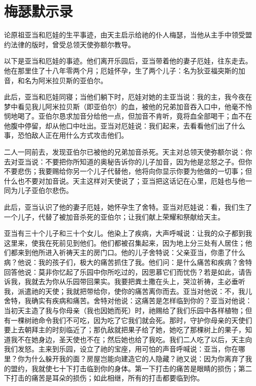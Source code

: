 
\chapter{梅瑟默示录}


论原祖亚当和厄娃的生平事迹，由天主启示给祂的仆人梅瑟，当他从主手中领受盟约法律的版时，曾受总领天使弥额尔教导。\par

以下是亚当和厄娃的事迹。他们离开乐园后，亚当带着他的妻子厄娃，往东走去。他在那里住了十八年零两个月；厄娃怀孕，生了两个儿子：名为狄亚福突斯的加音，和名为阿米拉贝斯的亚伯尔。\par

此后，亚当和厄娃同寝；当他们躺下时，厄娃对她的主亚当说：我的主，我今夜在梦中看见我儿阿米拉贝斯（即亚伯尔）的血，被他的兄弟加音吞入口中，他毫不怜悯地喝了。亚伯尔恳求加音分给他一点，但加音不肯听，竟将血全部喝干；血不在他腹中停留，却从他口中吐出。亚当对厄娃说：我们起来，去看看他们出了什么事，恐怕敌人正在用什么方式攻击他们。\par

二人一同前去，发现亚伯尔已被他的兄弟加音杀死。天主对总领天使弥额尔说：你去对亚当说：不要把你所知道的奥秘告诉你的儿子加音，因为他是忿怒之子。但你不要悲伤；我要赐给你另一个儿子代替他，他将向你显示你要为他做的一切事；但什么也不要对加音说。天主这样对天使说了；亚当把这话记在心里，厄娃也与他一同为儿子亚伯尔悲伤。\par

此后，亚当认识了他的妻子厄娃，她怀孕生了舍特。亚当对厄娃说：看，我们生了一个儿子，代替了被加音杀死的亚伯尔；让我们献上荣耀和祭献给天主。\par

亚当有三十个儿子和三十个女儿。他染上了疾病，大声呼喊说：让我的众子都到我这里来，使我在死前见到他们。他们都被召集起来，因为地上分三处有人居住；他们都来到他所进入祈祷天主的房门口。他的儿子舍特说：父亲亚当，你患了什么病？他说：我的孩子们，极大的痛苦抓住了我。他们问：是什么痛苦和疾病？舍特回答他说：莫非你忆起了乐园中你所吃过的，因思慕它们而忧伤？若是如此，请告诉我，我就去为你从乐园带回果实。我要把粪土撒在头上，哭泣祈祷，主必垂听我，派遣祂的天使；我就把带给你，使你的痛苦离你而去。亚当对他说：不，我儿舍特，我确实有疾病和痛苦。舍特对他说：这痛苦是怎样临到你的？亚当对他说：当初天主造了我与你母亲（我也因她而死）时，祂赐给了我们乐园中各样植物；但有一棵树祂命令我们不可吃，因为吃了它我们就会死。那时，守护你母亲的天使们要上去朝拜主的时刻临近了；那仇敌就把果子给了她，她吃了那棵树上的果子，知道我不在她身边，圣天使也不在；然后她也给了我吃。我们二人吃了以后，天主向我们发怒。主来到乐园，设立了祂的宝座，用可怕的声音呼喊说：亚当，你在哪里？你为什么躲开我的面？房屋岂能向建造它的人隐藏？祂又说：因为你离弃了我的盟约，我就使七十下打击临到你的身体。第一下打击的痛苦是眼睛的损伤；第二下打击的痛苦是耳朵的损伤；如此相继，所有的打击都要临到你。\par

